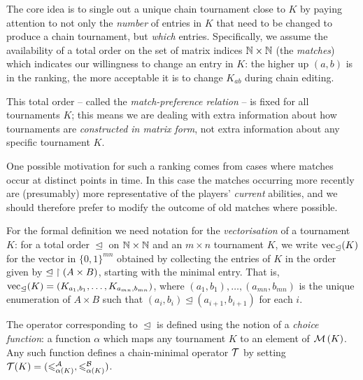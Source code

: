 The core idea is to single out a unique chain tournament close to $K$ by paying
attention to not only the \emph{number} of entries in $K$ that need to be
changed to produce a chain tournament, but \emph{which} entries. Specifically, we
assume the availability of a total order on the set of matrix indices $\mathbb{N}
\times \mathbb{N}$ (the \emph{matches}) which indicates our willingness to change an
entry in $K$: the higher up $(a, b)$ is in the ranking, the more acceptable it
is to change $K_{ab}$ during chain editing.

This total order -- called the \emph{match-preference relation} -- is fixed for
all tournaments $K$; this means we are dealing with extra information about how
tournaments are \emph{constructed in matrix form}, not extra information about
any specific tournament $K$.

One possible motivation for such a ranking comes from cases where matches occur
at distinct points in time. In this case the matches occurring more recently
are (presumably) more representative of the players' \emph{current} abilities,
and we should therefore prefer to modify the outcome of old matches where
possible.

For the formal definition we need notation for the \emph{vectorisation} of a
tournament $K$: for a total order ${\trianglelefteq}$ on $\mathbb{N} \times \mathbb{N}$ and an
$m \times n$ tournament $K$, we write $\operatorname{vec}_{\trianglelefteq}(K)$ for the
vector in $\{0,1\}^{mn}$ obtained by collecting the entries of $K$ in the order
given by ${\trianglelefteq} \upharpoonright (A \times B)$,\footnotemark{} starting with the
minimal entry. That is, $\operatorname{vec}_{\trianglelefteq}(K) = (K_{a_1,b_1}, \ldots,
K_{a_{mn},b_{mn}})$, where $(a_1,b_1), \ldots, (a_{mn},b_{mn})$ is the unique
enumeration of $A \times B$ such that $(a_i,b_i) \trianglelefteq
(a_{i+1},b_{i+1})$ for each $i$.


The operator corresponding to $\trianglelefteq$ is defined using the notion of
a \emph{choice function}: a function $\alpha$ which maps any tournament $K$ to
an element of $\operatorname{\mathcal{M}}\left({K}\right)$. Any such function defines a chain-minimal operator
$\mathcal{T}$ by setting $\mathcal{T}(K) = ({\leqslant^{\mathcal{A}}_{\alpha(K)}}, {\leqslant^{\mathcal{B}}_{\alpha(K)}})$.

